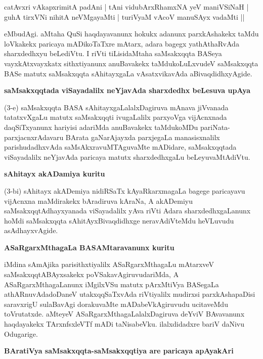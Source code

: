 \smallskip
\begin{shloka}
catAvxri vAkapxrimitA padAni | tAni vidubArxRhamxNA yeV maniVSiNaH |\\\label{31}
guhA tirxVNi nihitA neVMgayaMti | turiVyaM vAcoV manuSAyx vadaMti ||
\end{shloka}
\smallskip

eMbudAgi. aMtaha QuSi haqdayavanunx hokukx adanunx parxkAshakekx taMdu loVkakekx paricaya mADi\-koTaTxre mAtarx, adara bagegx yathAthaRvAda sharxdedhxyu beLediVtu. I riVti tiLisidaMtaha saMsakxqqta BASeya vayxkAtxvayxkatx sithxtiyanunx anuBavakekx taMdukoLuLxvudeV saMsakxqqta BASe matutx saMsakxqqta sAhitayxgaLa vAsatxvikavAda aBivaqdidhxyAgide.

\newpage

{\bigskip
\noindent
{\large\bf saMsakxqqtada viSayadalilx neYjavAda sharxdedhx beLesuva upAya}}\label{page31}
\medskip

\noindent
(3-e) saMsakxqqta BASA sAhitayxgaLalalxDagiruva mAnava jiVvanada tatatxvXgaLu matutx saMsakxqqti ivu\-gaLalilx parxyoVga vijAcnxnada daqSiTxyanunx hariyisi adariMda anuBavakekx taMdukoMDu pariNata-parxjacnx\-rAdavaru BArata gaNarAjayxda parxjegaLa manasisxnalilx pari\-shudadhxvAda saMsAkxravuMTAguvaMte mADi\-dare, saMsakxqqtada viSayadalilx neYjavAda paricaya matutx sharxdedhxgaLu beLeyuvaMtAdiVtu.

{\bigskip
\noindent
{\large\bf sAhitayx akADamiya kuritu}}\label{page32}
\medskip

\noindent
(3-bi) sAhitayx akADemiya nidiRSaTx kAyaRkarxmagaLa bagege paricayavu vijAcnxna maMdirakekx bAra\-diruva kAraNa, A akADemiyu saMsakxqqtAdhayxyanada viSayadalilx yAva riVti Adara sharxdedhxgaLanunx hoMdi saMsakxqqta sAhitAyxBivaqdidhxge neravAdiVteMdu heVLuvudu asAdhayxvAgide.

{\bigskip
\noindent
{\large\bf ASaRgarxMthagaLa BASAMtaravanunx kuritu}}
\medskip

\noindent
iMdina sAmAjika parisithxtiyalilx ASaRgarxMthagaLu mAtarxveV saMsakxqqtABAyxsakekx poVSakavAgiruvuda\-riMda, A ASaRgarxMthagaLanunx iMgilxVSu matutx pArxMtiVya BASegaLa athARnuvAdadoDaneV utakxqqSaTx\-vAda riVti\-yalilx mudirxsi parxkAshapaDisi saravxrigU sulaBavAgi dorakuvaMte mADabeVkAgiruvudu ucita\-veMdu toVru\-tatxde. aMteyeV ASaRgarxMthagaLalalxDagiruva deYviV BAvavanunx haqdayakekx TArxnfsxleVTf mADi taNisa\-beVku. ilalxdidadxre bariV daNivu Odugarige. 

{\bigskip
\noindent
{\large\bf BAratiVya saMsakxqqta-saMsakxqqtiya are paricaya apAyakAri}}\label{page32}
\medskip

